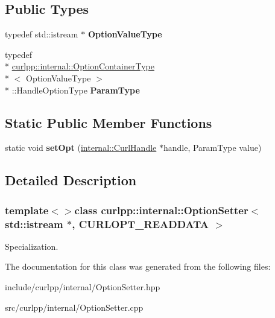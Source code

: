 \subsection*{Public Types}
\begin{DoxyCompactItemize}
\item 
\hypertarget{classcurlpp_1_1internal_1_1OptionSetter_3_01std_1_1istream_01_5_00_01CURLOPT__READDATA_01_4_abe5c7ba1c4a41322e6981868763a16d8}{typedef std\-::istream $\ast$ {\bfseries Option\-Value\-Type}}\label{classcurlpp_1_1internal_1_1OptionSetter_3_01std_1_1istream_01_5_00_01CURLOPT__READDATA_01_4_abe5c7ba1c4a41322e6981868763a16d8}

\item 
\hypertarget{classcurlpp_1_1internal_1_1OptionSetter_3_01std_1_1istream_01_5_00_01CURLOPT__READDATA_01_4_a84f4f5ac354e42c0064ada0df71997a8}{typedef \\*
\hyperlink{structcurlpp_1_1internal_1_1OptionContainerType}{curlpp\-::internal\-::\-Option\-Container\-Type}\\*
$<$ Option\-Value\-Type $>$\\*
\-::Handle\-Option\-Type {\bfseries Param\-Type}}\label{classcurlpp_1_1internal_1_1OptionSetter_3_01std_1_1istream_01_5_00_01CURLOPT__READDATA_01_4_a84f4f5ac354e42c0064ada0df71997a8}

\end{DoxyCompactItemize}
\subsection*{Static Public Member Functions}
\begin{DoxyCompactItemize}
\item 
\hypertarget{classcurlpp_1_1internal_1_1OptionSetter_3_01std_1_1istream_01_5_00_01CURLOPT__READDATA_01_4_aba6c787944129e49a48395e9ae63d6ba}{static void {\bfseries set\-Opt} (\hyperlink{classcurlpp_1_1internal_1_1CurlHandle}{internal\-::\-Curl\-Handle} $\ast$handle, Param\-Type value)}\label{classcurlpp_1_1internal_1_1OptionSetter_3_01std_1_1istream_01_5_00_01CURLOPT__READDATA_01_4_aba6c787944129e49a48395e9ae63d6ba}

\end{DoxyCompactItemize}


\subsection{Detailed Description}
\subsubsection*{template$<$$>$class curlpp\-::internal\-::\-Option\-Setter$<$ std\-::istream $\ast$, C\-U\-R\-L\-O\-P\-T\-\_\-\-R\-E\-A\-D\-D\-A\-T\-A $>$}

Specialization. 

The documentation for this class was generated from the following files\-:\begin{DoxyCompactItemize}
\item 
include/curlpp/internal/Option\-Setter.\-hpp\item 
src/curlpp/internal/Option\-Setter.\-cpp\end{DoxyCompactItemize}
